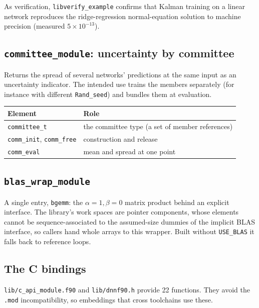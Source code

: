 \documentclass[10pt,a4paper]{article}
\newcommand{\code}[1]{\texttt{#1}}
\begin{document}
As verification, \code{libverify\_example} confirms that Kalman
training on a linear network reproduces the ridge-regression
normal-equation solution to machine precision (measured
$5\times10^{-13}$).

\subsection{\code{committee\_module}: uncertainty by committee}

Returns the spread of several networks' predictions at the same input
as an uncertainty indicator. The intended use trains the members
separately (for instance with different \code{Rand\_seed}) and bundles
them at evaluation.

\begin{longtable}{@{}p{}p{}@{}}
\toprule
Element & Role \\
\midrule
\endhead
\code{committee\_t} & the committee type (a set of member references)\\
\code{comm\_init}, \code{comm\_free} & construction and release\\
\code{comm\_eval} & mean and spread at one point\\
\bottomrule
\end{longtable}

\subsection{\code{blas\_wrap\_module}}

A single entry, \code{bgemm}: the $\alpha=1,\beta=0$ matrix product
behind an explicit interface. The library's work spaces are pointer
components, whose elements cannot be sequence-associated to the
assumed-size dummies of the implicit BLAS interface, so callers hand
whole arrays to this wrapper. Built without \code{USE\_BLAS} it falls
back to reference loops.

\subsection{The C bindings}
\label{sec:capi}

\code{lib/c\_api\_module.f90} and \code{lib/dnnf90.h} provide 22
functions. They avoid the \code{.mod} incompatibility, so embeddings
that cross toolchains use these.
\end{document}

